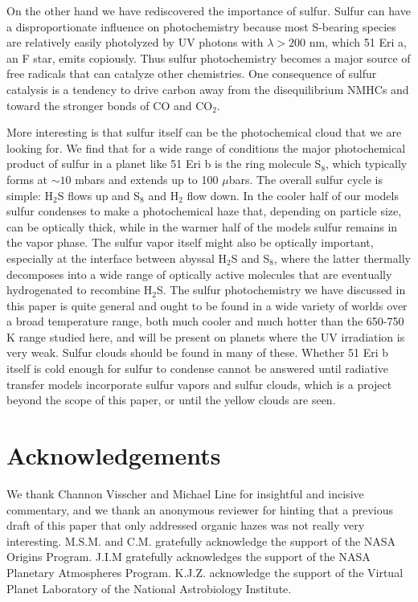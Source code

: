 \documentclass[preprint]{aastex6}
\begin{document}
On the other hand we have rediscovered the importance of sulfur. 
Sulfur can have a disproportionate influence on photochemistry
because most S-bearing species are relatively easily photolyzed by 
UV photons with $\lambda > 200$ nm, which 51 Eri a, an F star, emits copiously.
Thus sulfur photochemistry becomes a major source of free radicals that can catalyze other chemistries.
One consequence of sulfur catalysis is a tendency to drive carbon 
away from the disequilibrium NMHCs and toward the stronger bonds of CO and CO$_2$.

More interesting is that sulfur itself can be the photochemical cloud that we are looking for.
We find that for a wide range of conditions the major photochemical product of sulfur in 
a planet like 51 Eri b is the ring molecule S$_8$, which typically forms at $\sim 10$ mbars
and extends up to 100 $\mu$bars.
The overall sulfur cycle is simple: H$_2$S flows up and S$_8$ and H$_2$ flow down.
In the cooler half of our models sulfur condenses to make a photochemical haze that, depending on particle size,
can be optically thick, while in the warmer half of the models sulfur remains in the vapor phase.
The sulfur vapor itself might also be optically important, especially at the interface between
abyssal H$_2$S and S$_8$, where the latter thermally decomposes into a wide range of optically active
molecules that are eventually hydrogenated to recombine H$_2$S. 
The sulfur photochemistry we have discussed in this paper is quite general and ought to be found
in a wide variety of worlds over a broad temperature range, both much cooler and much hotter
than the 650-750 K range studied here, and will be present on planets where the UV irradiation is very weak.  
Sulfur clouds should be found in many of these.  
Whether 51 Eri b itself is cold enough for sulfur to condense cannot be answered until
radiative transfer models incorporate sulfur vapors and sulfur clouds,
which is a project beyond the scope of this paper, or until the yellow clouds are seen.

\section{Acknowledgements}
We thank Channon Visscher and Michael Line for insightful and incisive commentary, and
we thank an anonymous reviewer for hinting that a previous draft of this paper
 that only addressed organic hazes was not really very interesting.     
M.S.M. and C.M. gratefully acknowledge the support of the NASA Origins Program.
J.I.M gratefully acknowledges the support of the NASA Planetary Atmospheres Program.
K.J.Z. acknowledge the support of the Virtual Planet Laboratory of the National Astrobiology Institute.
\end{document}
